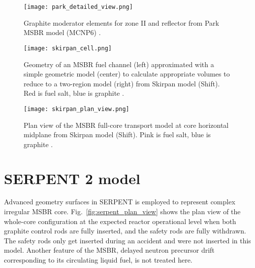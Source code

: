 \begin{figure}[hbp!] %
  \centering
  \vspace{-0.3em}
  \texttt{[image: park\_detailed\_view.png]}
  \caption{Graphite moderator elements  for zone II and reflector from Park \gls{MSBR} model (MCNP6) \cite{park_whole_2015}.}
  \vspace{-0.6em}
  \label{fig:park}
\end{figure}
\FloatBarrier

\begin{figure}[htp!] %
  \centering
  \vspace{-0.3em}
  \texttt{[image: skirpan\_cell.png]}
  \caption{Geometry of an MSBR fuel channel (left) approximated with a simple geometric model (center) to calculate appropriate volumes to reduce to a two-region model (right) from Skirpan model (Shift). Red is fuel salt, blue is graphite \cite{skirpan_fuel_2017}.}
  \vspace{-0.6em}
  \label{fig:skirpan_cell}
\end{figure}

\begin{figure}[hbp!] %
  \centering
  \vspace{-0.3em}
  \texttt{[image: skirpan\_plan\_view.png]}
  \caption{Plan view of the \gls{MSBR} full-core transport model at core horizontal midplane from Skirpan model (Shift). Pink is fuel salt, blue is graphite \cite{skirpan_fuel_2017}.}
  \vspace{-0.6em}
  \label{fig:skirpan_plan}
\end{figure}
\FloatBarrier

\section{SERPENT 2 model}

Advanced geometry surfaces in SERPENT is employed to represent complex irregular \gls{MSBR} core. Fig.~\ref{fig:serpent_plan_view} shows the plan view of the whole-core configuration at the expected reactor operational level when both graphite control rods are fully inserted, and the safety rods are fully withdrawn. The safety rods only get inserted during an accident and were not inserted in this model. Another feature of the \gls{MSBR}, delayed neutron precursor drift corresponding to its circulating liquid fuel, is not treated here. 

